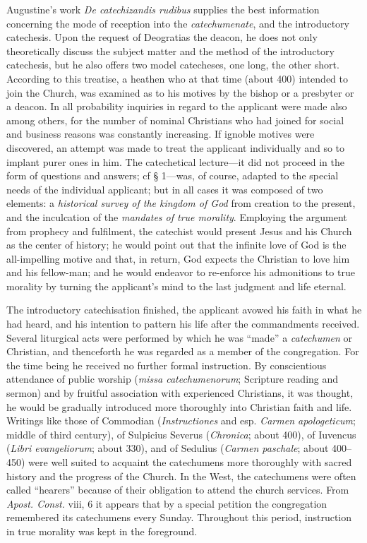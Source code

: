 Augustine’s work \emph{De catechizandis rudibus} supplies the best information concerning the mode of reception into the
\emph{catechumenate}, and the introductory catechesis. Upon the request of Deogratias the deacon, he does not only theoretically discuss the subject matter and the method of the introductory catechesis, but he also offers two model catecheses, one long, the other short. According to this treatise, a heathen who at that time (about 400) intended to join the Church, was examined as to his motives by the bishop or a presbyter or a deacon. In all probability inquiries in regard to the applicant were made also among others, for the number of nominal Christians who had joined for social and business reasons was constantly increasing. If ignoble motives were discovered, an attempt was made to treat the applicant individually and so to implant purer ones in him. The catechetical lecture—it did not proceed in the form of questions and answers; cf § 1—was, of course, adapted to the special needs of the individual applicant; but in all cases it was composed of two elements: a \emph{historical survey of the kingdom of God} from creation to the present, and the inculcation of the \emph{mandates of true morality}. Employing the argument from prophecy and fulfilment, the catechist would present Jesus and his Church as the center of history; he would point out that the infinite love of God is the all-impelling motive and that, in return, God expects the Christian to love him and his fellow-man; and he would endeavor to re-enforce his admonitions to true morality by turning the applicant’s mind to the last judgment and life eternal.

The introductory catechisation finished, the applicant avowed his faith in what he had heard, and his intention to pattern his life after the commandments received. Several liturgical acts were performed by which he was “made” a \emph{catechumen} or Christian, and thenceforth he was regarded as a member of the congregation. For the time being he received no further formal instruction. By conscientious attendance of public worship (\emph{missa catechumenorum}; Scripture reading
and sermon) and by fruitful association with experienced Christians, it was thought, he would be gradually introduced more thoroughly into Christian faith and life. Writings like those of Commodian (\emph{Instructiones} and esp. \emph{Carmen apologeticum}; middle of third century), of Sulpicius Severus (\emph{Chronica}; about 400), of Iuvencus (\emph{Libri evangeliorum}; about 330), and of Sedulius (\emph{Carmen paschale}; about 400–450) were well suited to acquaint the catechumens more thoroughly with sacred history and the progress of the Church. In the West, the catechumens were often called “hearers” because of their obligation to attend the church services. From \emph{Apost. Const.} viii, 6 it appears that by a special petition the congregation remembered its catechumens every Sunday. Throughout this period, instruction in true morality was kept in the foreground.


